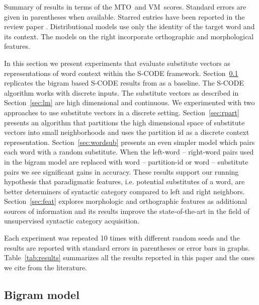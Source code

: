 \documentclass[11pt]{article}
\newcommand{\mto}{\mbox{MTO }}
\newcommand{\vm}{\mbox{VM }}
\begin{document}
\begin{table}[t]
\caption{Summary of results in terms of the \mto and \vm scores.
  Standard errors are given in parentheses when available.  Starred
  entries have been reported in the review paper
  \cite{Christodoulopoulos:2010:TDU:1870658.1870714}.  Distributional
  models use only the identity of the target word and its context.
  The models on the right incorporate orthographic and
  morphological features.}
\label{tab:results}
\end{table}

In this section we present experiments that evaluate substitute
vectors as representations of word context within the S-CODE
framework.  Section~\ref{sec:bigram} replicates the bigram based
S-CODE results from \cite{maron2010sphere} as a baseline.  The S-CODE
algorithm works with discrete inputs.  The substitute vectors as
described in Section~\ref{sec:lm} are high dimensional and continuous.
We experimented with two approaches to use substitute vectors in a
discrete setting.  Section~\ref{sec:rpart} presents an algorithm that
partitions the high dimensional space of substitute vectors into small
neighborhoods and uses the partition id as a discrete context
representation.  Section~\ref{sec:wordsub} presents an even simpler
model which pairs each word with a random substitute.  When the
left-word -- right-word pairs used in the bigram model are replaced
with word -- partition-id or word -- substitute pairs we see
significant gains in accuracy.  These results support our running
hypothesis that paradigmatic features, i.e. potential substitutes of a
word, are better determiners of syntactic category compared to left
and right neighbors.  Section~\ref{sec:feat} explores morphologic and
orthographic features as additional sources of information and its
results improve the state-of-the-art in the field of unsupervised
syntactic category acquisition.

Each experiment was repeated 10 times with different random seeds and
the results are reported with standard errors in parentheses or error
bars in graphs.  Table~\ref{tab:results} summarizes all the results
reported in this paper and the ones we cite from the literature.

\subsection{Bigram model}\label{sec:bigram}
\end{document}
